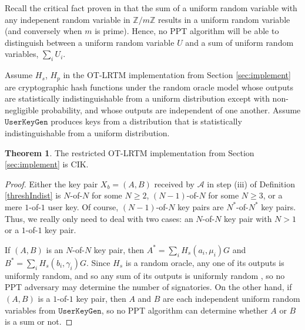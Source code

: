 \documentclass{mrl}
\theoremstyle{definition}
\newtheorem{theorem}{Theorem}[subsection]
\begin{document}
 
 Recall the critical fact proven in \cite{scozzafava1993uniform} that the sum of a uniform random variable with any indepenent random variable in $\mathbb{Z}/m\mathbb{Z}$ results in a uniform random variable (and conversely when $m$ is prime). Hence, no PPT algorithm will be able to distinguish between a uniform random variable $U$ and a sum of uniform random variables, $\sum_i U_i$. 
 
 Assume $H_s$, $H_p$ in the OT-LRTM implementation from Section \ref{sec:implement} are cryptographic hash functions under the random oracle model whose outputs are statistically indistinguishable from a uniform distribution except with non-negligible probability, and whose outputs are independent of one another. Assume $\texttt{UserKeyGen}$ produces keys from a distribution  that is statistically indistinguishable from a uniform distribution. 
 


\begin{theorem}
The restricted OT-LRTM implementation from Section \ref{sec:implement} is CIK.
\end{theorem}
\begin{proof}
Either the key pair $X_b = (A,B)$ received by $\mathcal{A}$ in step (iii) of Definition \ref{threshIndist} is $N$-of-$N$ for some $N \geq 2$, $(N-1)$-of-$N$ for some $N \geq 3$, or a mere $1$-of-$1$ user key. Of course, $(N-1)$-of-$N$ key pairs are $N^*$-of-$N^*$ key pairs. Thus, we really only need to deal with two cases: an $N$-of-$N$ key pair with $N > 1$ or a $1$-of-$1$ key pair.
  
If $(A,B)$ is an $N$-of-$N$ key pair, then $A^* = \sum_{i} H_s(a_i, \mu_i) G$ and $B^* = \sum_i H_s(b_i, \gamma_i) G$. Since $H_s$ is a random oracle, any one of its outputs is uniformly random, and so any sum of its outputs is uniformly random \cite{scozzafava1993uniform}, so no PPT adversary may determine the number of signatories. On the other hand, if $(A,B)$ is a $1$-of-$1$ key pair, then $A$ and $B$ are each independent uniform random variables from $\texttt{UserKeyGen}$, so no PPT algorithm can determine whether $A$ or $B$ is a sum or not.
  
\end{proof}
  
\end{document}
